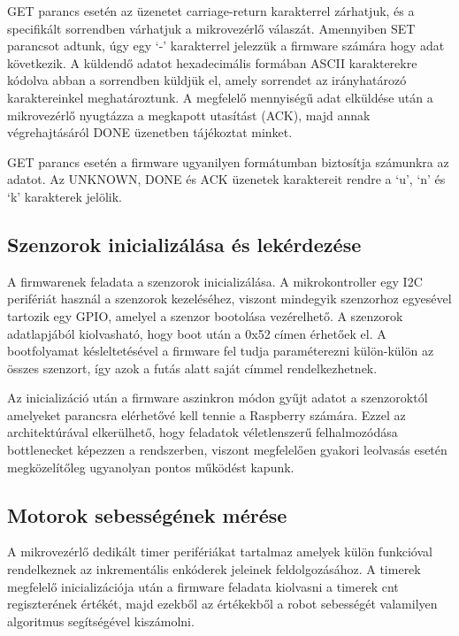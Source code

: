GET parancs esetén az üzenetet carriage-return karakterrel zárhatjuk, és a
specifikált sorrendben várhatjuk a mikrovezérlő válaszát. Amennyiben SET
parancsot adtunk, úgy egy `-' karakterrel jelezzük a firmware számára hogy adat
következik. A küldendő adatot hexadecimális formában ASCII karakterekre kódolva
abban a sorrendben küldjük el, amely sorrendet az irányhatározó karaktereinkel
meghatároztunk. A megfelelő mennyiségű adat elküldése után a mikrovezérlő
nyugtázza a megkapott utasítást (ACK), majd annak végrehajtásáról DONE üzenetben
tájékoztat minket.

GET parancs esetén a firmware ugyanilyen formátumban biztosítja számunkra az
adatot. Az UNKNOWN, DONE és ACK üzenetek karaktereit rendre a `u', `n' és `k'
karakterek jelölik.

\medskip

\subsection{Szenzorok inicializálása és lekérdezése}

A firmwarenek feladata a szenzorok inicializálása. A mikrokontroller egy I2C
perifériát használ a szenzorok kezeléséhez, viszont mindegyik szenzorhoz
egyesével tartozik egy GPIO, amelyel a szenzor bootolása vezérelhető. A szenzorok
adatlapjából kiolvasható, hogy boot után a 0x52 címen érhetőek el. A bootfolyamat
késleltetésével a firmware fel tudja paraméterezni külön-külön az összes
szenzort, így azok a futás alatt saját címmel rendelkezhetnek.

Az inicializáció után a firmware aszinkron módon gyűjt adatot a szenzoroktól
amelyeket parancsra elérhetővé kell tennie a Raspberry számára. Ezzel az
architektúrával elkerülhető, hogy feladatok véletlenszerű felhalmozódása
bottlenecket képezzen a rendszerben, viszont megfelelően gyakori leolvasás esetén
megközelítőleg ugyanolyan pontos működést kapunk.

\subsection{Motorok sebességének mérése}

A mikrovezérlő dedikált timer perifériákat tartalmaz amelyek külön funkcióval
rendelkeznek az inkrementális enkóderek jeleinek feldolgozásához. A timerek
megfelelő inicializációja után a firmware feladata kiolvasni a timerek cnt
regiszterének értékét, majd ezekből az értékekből a robot sebességét valamilyen
algoritmus segítségével kiszámolni.

